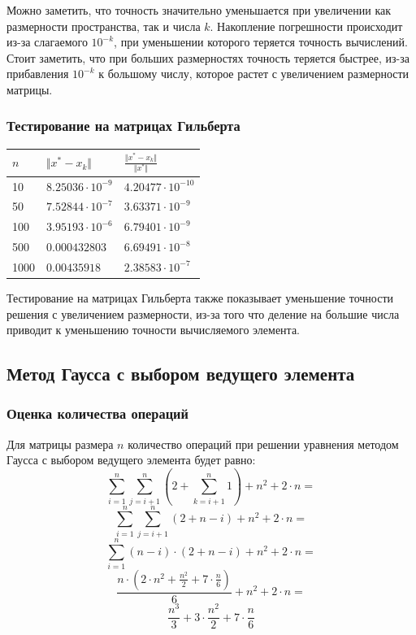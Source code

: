 \documentclass[english]{article}
\begin{document}
Можно заметить, что точность значительно уменьшается при увеличении
как размерности пространства, так и числа \(k\). Накопление
погрешности происходит из-за слагаемого \(10^{-k}\), при уменьшении
которого теряется точность вычислений. Стоит заметить, что при больших
размерностях точность теряется быстрее, из-за прибавления \(10^{-k}\)
к большому числу, которое растет с увеличением размерности матрицы.

\subsubsection{Тестирование на матрицах Гильберта}
\begin{center}
  \begin{longtable}{l|l|l}
    \(n\) & \(\Vert x^* - x_k \Vert\) & \(\frac{\Vert x^* - x_k \Vert}{\Vert x^* \Vert}\) \\
    \hline
    10 & \(8.25036\cdot 10^{-9}\) & \(4.20477\cdot 10^{-10}\) \\
    50 & \(7.52844\cdot 10^{-7}\) & \(3.63371\cdot 10^{-9}\) \\
    100 & \(3.95193\cdot 10^{-6}\) & \(6.79401\cdot 10^{-9}\) \\
    500 & \(0.000432803\) & \(6.69491\cdot 10^{-8}\) \\
    1000 & \(0.00435918 \) & \(2.38583\cdot 10^{-7}\) 
  \end{longtable}
\end{center}

Тестирование на матрицах Гильберта также показывает уменьшение
точности решения с увеличением размерности, из-за того что деление на
большие числа приводит к уменьшению точности вычисляемого элемента.

\subsection{Метод Гаусса с выбором ведущего элемента}
\subsubsection{Оценка количества операций}
Для матрицы размера \(n\) количество операций при решении уравнения методом Гаусса с выбором ведущего элемента будет равно:
\[ \sum_{i=1}^{n} \sum_{j=i + 1}^{n} (2 + \sum_{k=i+1}^{n} 1) + n^2 + 2\cdot n =\]
\[ \sum_{i=1}^{n} \sum_{j=i + 1}^{n} (2 + n - i) + n^2 + 2\cdot n =\]
\[ \sum_{i=1}^{n} (n - i)\cdot (2 + n - i) + n^2 + 2\cdot n =\]
\[ \frac{n \cdot (2 \cdot n^2 + \frac{n^2}{2} + 7 \cdot \frac{n}{6})}{6} + n^2 + 2 \cdot n =\]
\[ \frac{n^3}{3} + 3 \cdot \frac{n^2}{2} + 7 \cdot \frac{n}{6}\]
\end{document}

